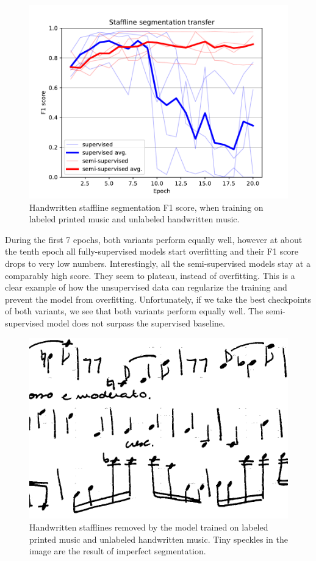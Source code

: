 \begin{figure}[ht]
    \centering
    \includegraphics[width=140mm]{../../figures/04-staffline-transfer/transfer.pdf}
    \caption{Handwritten staffline segmentation F1 score, when training on labeled printed music and unlabeled handwritten music.}
    \label{fig:StafflineTransfer}
\end{figure}

During the first 7 epochs, both variants perform equally well, however at about the tenth epoch all fully-supervised models start overfitting and their F1 score drops to very low numbers. Interestingly, all the semi-supervised models stay at a comparably high score. They seem to plateau, instead of overfitting. This is a clear example of how the unsupervised data can regularize the training and prevent the model from overfitting. Unfortunately, if we take the best checkpoints of both variants, we see that both variants perform equally well. The semi-supervised model does not surpass the supervised baseline.

\begin{figure}[ht]
    \centering
    \includegraphics[width=140mm]{../../figures/04-staffline-transfer/staffline-removal.png}
    \caption{Handwritten stafflines removed by the model trained on labeled printed music and unlabeled handwritten music. Tiny speckles in the image are the result of imperfect segmentation.}
    \label{fig:StafflineRemoval}
\end{figure}

